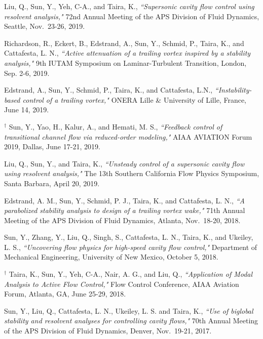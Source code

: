 \documentclass[10pt]{article}
\begin{document}
{\begin{etaremune}
\item Liu, Q., Sun, Y., Yeh, C-A., and Taira, K., {\it ``Supersonic cavity flow control using resolvent analysis," } 72nd Annual Meeting of the APS Division of Fluid Dynamics, Seattle, Nov.~23-26, 2019.

\item Richardson, R., Eckert, B., Edstrand, A., Sun, Y., Schmid, P., Taira, K., and Cattafesta, L. N., {\it ``Active attenuation of a trailing vortex inspired by a stability analysis," } 9th IUTAM Symposium on Laminar-Turbulent Transition, London, Sep. 2-6, 2019. 

\item Edstrand, A., Sun, Y., Schmid, P., Taira, K., and Cattafesta, L.N., {\it ``Instability-based control of a trailing vortex," } ONERA Lille \& University of Lille, France, June 14, 2019.

\item $\boldsymbol {^\dagger}$ Sun, Y., Yao, H., Kalur, A., and Hemati, M. S., {\it ``Feedback control of transitional channel flow via reduced-order modeling," } AIAA AVIATION Forum 2019, Dallas, June 17-21, 2019. 

\item Liu, Q., Sun, Y., and Taira, K., {\it ``Unsteady control of a supersonic cavity flow using resolvent analysis,"} The 13th Southern California Flow Physics Symposium, Santa Barbara, April 20, 2019.

\item Edstrand, A. M., Sun, Y., Schmid, P. J., Taira, K., and Cattafesta, L. N., {\it ``A parabolized stability analysis to design of a trailing vortex wake,"} 71th Annual Meeting of the APS Division of Fluid Dynamics, Atlanta, Nov.~18-20, 2018.

\item Sun, Y., Zhang, Y., Liu, Q., Singh, S., Cattafesta, L. N., Taira, K., and Ukeiley, L. S., {\it ``Uncovering flow physics for high-speed cavity flow control,"} Department of Mechanical Engineering, University of New Mexico, October 5, 2018.

\item $\boldsymbol {^\dagger}$ Taira, K., Sun, Y., Yeh, C-A., Nair, A. G., and Liu, Q., {\it ``Application of Modal Analysis to Active Flow Control," } Flow Control Conference, AIAA Aviation Forum, Atlanta, GA, June 25-29, 2018.

\item Sun, Y., Liu, Q., Cattafesta, L. N., Ukeiley, L. S. and Taira, K., {\it ``Use of biglobal stability and resolvent analyses for controlling cavity flows,"} 70th Annual Meeting of the APS Division of Fluid Dynamics, Denver, Nov.~19-21, 2017.


\end{etaremune}}
\end{document}
